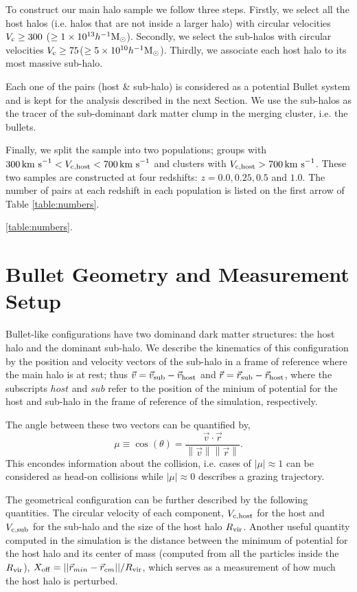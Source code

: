 \documentclass{emulateapj}
\newcommand{\hMsun}{{\ifmmode{h^{-1}{\rm {M_{\odot}}}}\else{$h^{-1}{\rm{M_{\odot}}}$}\fi}}
\newcommand{\kms}{{\ifmmode{{\mathrm{\,km\ s}^{-1}}}\else{\,km~s$^{-1}$}\fi}}
\begin{document}
To construct our main halo sample we follow three
steps. Firstly, we select all the host halos (i.e. halos that are not
inside a larger halo) with circular velocities $V_{\rm c}\geq 300$\kms
($\geq 1\times 10^{13} \hMsun$). Secondly, we select the sub-halos with
circular velocities $V_{\rm c}\geq 75$\kms ($\geq 5\times
10^{10}\hMsun$). Thirdly, we associate each host halo to its most
massive sub-halo. 


Each one of the pairs (host \& sub-halo) is considered as a
potential Bullet system and is kept for the analysis described in the
next Section. We use the sub-halos as the tracer of the sub-dominant
dark matter clump in the merging cluster, i.e. the bullets.  


Finally, we split the sample into two  populations; groups with
$300\kms < V_{\rm c, host}<700\kms$ and clusters with $V_{\rm
  c,host}>700\kms$. These two samples are constructed at four redshifts:
$z=0.0, 0.25, 0.5$ and $1.0$.  The number of pairs at each redshift in
each population is listed on the first arrow of Table
\ref{table:numbers}. 

\ref{table:numbers}.  


\section{Bullet Geometry and Measurement Setup}
\label{sec:setup}

Bullet-like configurations have two dominand dark matter structures:
the host halo and the dominant sub-halo. We describe the kinematics of this configuration by the 
position and velocity vectors of the sub-halo in a frame of reference
where the main halo is at rest; thus
$\vec{v{}}=\vec{v}_{\rm sub}-\vec{v}_{\rm host}$ and
$\vec{r{}}=\vec{r}_{\rm sub}-\vec{r}_{\rm host}$, where the subscripts $host$
and $sub$ refer to the position of the minium of potential for the
host and sub-halo in the frame of reference of the simulation, respectively.  

The angle between these two vectors can be quantified by, 
\begin{equation}
  \mu\equiv
  \cos(\theta)=\frac{\vec{v{}}\cdotp{}\vec{r}}{\left\|\vec{v}{}\right\|
    \left\|\vec{r}\right\|} .
 \end{equation} 
%
This encondes information about the collision, i.e. cases of
$|\mu|\approx 1$ can be considered as head-on collisions while
$|\mu|\approx 0$ describes a grazing trajectory.  

The geometrical configuration can be further described by the
following quantities. The circular velocity of each component, $V_{\rm
  c,host}$ for the host and $V_{\rm c, sub}$ for the sub-halo and the
size of the host halo $R_{\rm vir}$. Another useful quantity computed
in the simulation is the distance between the minimum of potential for
the host halo and its center of mass (computed from all the particles
inside the $R_{\rm vir}$), $X_{\rm off}=||\vec{r}_{min}-\vec{r}_{cm}||/R_{\rm vir}$, which serves as a
measurement of how much the host halo is perturbed. 
\end{document}
